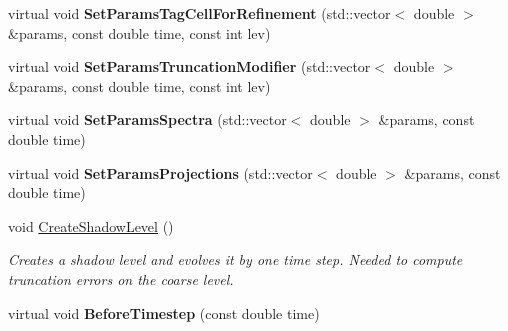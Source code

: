 \begin{DoxyCompactItemize}
\item 
\mbox{\label{classsledgehamr_1_1Sledgehamr_ad38a472702a9bb491988bdc7ead8f27b}} 
virtual void {\bfseries Set\+Params\+Tag\+Cell\+For\+Refinement} (std\+::vector$<$ double $>$ \&params, const double time, const int lev)
\item 
\mbox{\label{classsledgehamr_1_1Sledgehamr_aaf352778e8706f7352bc1909e6bdd2aa}} 
virtual void {\bfseries Set\+Params\+Truncation\+Modifier} (std\+::vector$<$ double $>$ \&params, const double time, const int lev)
\item 
\mbox{\label{classsledgehamr_1_1Sledgehamr_aa19c6b1f0bb4ff23df49baa8c3725d60}} 
virtual void {\bfseries Set\+Params\+Spectra} (std\+::vector$<$ double $>$ \&params, const double time)
\item 
\mbox{\label{classsledgehamr_1_1Sledgehamr_ad11ee726fd88f667a6da0a103f42563a}} 
virtual void {\bfseries Set\+Params\+Projections} (std\+::vector$<$ double $>$ \&params, const double time)
\item 
\mbox{\label{classsledgehamr_1_1Sledgehamr_a203fe3b2f9001a0c5572b3a5d55bbec3}} 
void \mbox{\hyperlink{classsledgehamr_1_1Sledgehamr_a203fe3b2f9001a0c5572b3a5d55bbec3}{Create\+Shadow\+Level}} ()
\begin{DoxyCompactList}\small\item\em Creates a shadow level and evolves it by one time step. Needed to compute truncation errors on the coarse level. \end{DoxyCompactList}\item 
\mbox{\label{classsledgehamr_1_1Sledgehamr_a4625543f3cf36f29e1b7daaa05e8c668}} 
virtual void {\bfseries Before\+Timestep} (const double time)
\end{DoxyCompactItemize}
